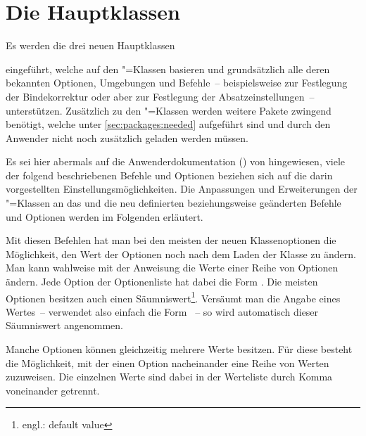 \documentclass[%
  english,ngerman,%
  headings=optiontoheadandtoc,captions=tableheading,numbers=noenddot,%
  chapterpage,cdfoot,%
]{tudscrman}
\begin{document}
\chapter[Die Hauptklassen tudscrbook, tudscrreprt, tudscrartcl]{Die Hauptklassen}
Es werden die drei neuen Hauptklassen
%
\begin{description}
\item {}
\item {}
\item {}
\end{description}
%
eingeführt, welche auf den \KOMAScript"=Klassen basieren und grundsätzlich alle
deren bekannten Optionen, Umgebungen und Befehle~-- beispielsweise
 zur Festlegung der Bindekorrektur oder aber 
zur Festlegung der Absatzeinstellungen~-- unterstützen. Zusätzlich zu den 
\KOMAScript"=Klassen werden weitere Pakete zwingend benötigt, welche unter 
\autoref{sec:packages:needed} aufgeführt sind und durch den Anwender nicht noch 
zusätzlich geladen werden müssen. 

Es sei hier abermals auf die Anwenderdokumentation () von 
\KOMAScript{} hingewiesen, viele der folgend beschriebenen Befehle und Optionen 
beziehen sich auf die darin vorgestellten Einstellungsmöglichkeiten. Die 
Anpassungen und Erweiterungen der \KOMAScript"=Klassen an das \CD und die neu 
definierten beziehungsweise geänderten Befehle und Optionen werden im Folgenden 
erläutert.

\begin{Declaration}{}
\begin{Declaration}{}
\printdeclarationlist%
%
%
Mit diesen Befehlen hat man bei den meisten der neuen Klassenoptionen die 
Möglichkeit, den Wert der Optionen noch nach dem Laden der Klasse zu ändern.
Man kann wahlweise mit der Anweisung  die Werte einer Reihe 
von Optionen ändern. Jede Option der Optionenliste hat dabei die Form
\PValue{=}. Die meisten Optionen besitzen auch einen 
Säumniswert\footnote{engl.: default value}. Versäumt man die Angabe eines 
Wertes~-- verwendet also einfach die Form ~-- so wird automatisch 
dieser Säumniswert angenommen.

Manche Optionen können gleichzeitig mehrere Werte besitzen. Für diese besteht 
die Möglichkeit, mit  der einen Option nacheinander eine 
Reihe von Werten zuzuweisen. Die einzelnen Werte sind dabei in der Werteliste 
durch Komma voneinander getrennt.
\end{Declaration}
\end{Declaration}
\end{document}
